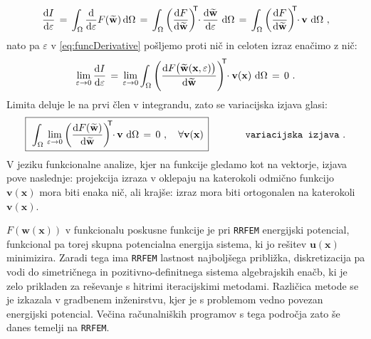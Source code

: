 \begin{equation*}
	\frac{\mathrm{d} I}{\mathrm{d} \varepsilon} \,
	=
	\, \int_{\Omega} \frac{\mathrm{d}}{\mathrm{d} \varepsilon} F(\widetilde{\mathbf{w}}) \, \mathrm{d} \Omega \,
	=
	\, \int_{\Omega} \left(\frac{\mathrm{d} F}{\mathrm{d} \widetilde{\mathbf{w}}}\right)^\mathsf{\mkern-7mu T} \mkern-5mu \cdot \mkern-1mu \frac{\mathrm{d} \widetilde{\mathbf{w}}}{\mathrm{d} \varepsilon} \ \mathrm{d} \Omega \,
	=
	\, \int_{\Omega} \left(\frac{\mathrm{d} F}{\mathrm{d} \widetilde{\mathbf{w}}}\right)^\mathsf{\mkern-7mu T} \mkern-5mu \cdot \mkern-1mu \mathbf{v} \ \mathrm{d} \Omega \ ,
\label{eq:funcDerivative}
\end{equation*}
nato pa $\varepsilon$ v \eqref{eq:funcDerivative} pošljemo proti nič in celoten izraz enačimo z nič:
\begin{equation*}
	\lim_{\varepsilon \rightarrow 0} \frac{\mathrm{d} I}{\mathrm{d} \varepsilon} \,
	=
	\, \lim_{\varepsilon \rightarrow 0} \int_{\Omega} \left(\frac{\mathrm{d} F\big(\widetilde{\mathbf{w}}(\mathbf{x}, \varepsilon)\big)}{\mathrm{d} \widetilde{\mathbf{w}}}\right)^\mathsf{\mkern-7mu T} \mkern-5mu \cdot \mathbf{v(\mathbf{x})} \ \mathrm{d} \Omega \,
	=
	\, 0 \ .
\end{equation*}
Limita deluje le na prvi člen v integrandu, zato se variacijska izjava glasi:
\begin{equation}
	\boxed{\, \vphantom{\bigg)^2_3}
		\int_{\Omega} \, \lim_{\varepsilon \rightarrow 0} \left(\frac{\ud F(\widetilde{\mathbf{w}})}{\ud \widetilde{\mathbf{w}}} \right)^\mathsf{\mkern-7mu T} \mkern-5mu \cdot \mkern-1mu \mathbf{v} \ \ud \Omega \, = \, 0 \ , \quad \forall \mathbf{v(\mathbf{x})}\,
	}
	\hspace{1.3cm} \texttt{variacijska izjava} \ .
	\label{eq:variationalStatement}
\end{equation}
V jeziku funkcionalne analize, kjer na funkcije gledamo kot na vektorje, izjava pove naslednje: projekcija izraza v oklepaju na katerokoli odmično funkcijo $\mathbf{v(x)}$ mora biti enaka nič, ali krajše: izraz mora biti ortogonalen na katerokoli $\mathbf{v(x)}$.

$F\left(\mathbf{w}(\mathbf{x})\right)$ v funkcionalu poskusne funkcije je pri \texttt{RRFEM} energijski potencial, funkcional pa torej skupna potencialna energija sistema, ki jo rešitev $\mathbf{u}(\mathbf{x})$ minimizira. Zaradi tega ima \texttt{RRFEM} last\-nost najboljšega približka, diskretizacija pa vodi do simetričnega in pozitivno-definitnega sistema algebrajskih enačb, ki je zelo prikladen za reševanje s hitrimi iteracijskimi metodami. Različica metode se je izkazala v gradbenem inženirstvu, kjer je s problemom vedno povezan energijski potencial. Večina računalniških programov s tega področja zato še danes temelji na \texttt{RRFEM}.

